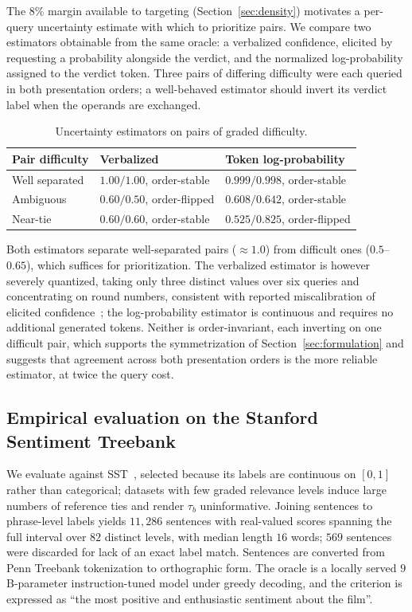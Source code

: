 \documentclass[11pt,a4paper]{article}
\begin{document}
The $8\%$ margin available to targeting (Section~\ref{sec:density}) motivates a
per-query uncertainty estimate with which to prioritize pairs. We compare two
estimators obtainable from the same oracle: a verbalized confidence, elicited by
requesting a probability alongside the verdict, and the normalized
log-probability assigned to the verdict token. Three pairs of differing
difficulty were each queried in both presentation orders; a well-behaved
estimator should invert its verdict label when the operands are exchanged.

\begin{table}[h]
\centering
\begin{tabular}{lll}
\toprule
Pair difficulty & Verbalized & Token log-probability \\
\midrule
Well separated & $1.00 / 1.00$, order-stable  & $0.999 / 0.998$, order-stable \\
Ambiguous      & $0.60 / 0.50$, order-flipped & $0.608 / 0.642$, order-stable \\
Near-tie       & $0.60 / 0.60$, order-stable  & $0.525 / 0.825$, order-flipped \\
\bottomrule
\end{tabular}
\caption{Uncertainty estimators on pairs of graded difficulty.}
\label{tab:conf}
\end{table}

Both estimators separate well-separated pairs (${\approx}1.0$) from difficult
ones ($0.5$--$0.65$), which suffices for prioritization. The verbalized estimator
is however severely quantized, taking only three distinct values over six
queries and concentrating on round numbers, consistent with reported
miscalibration of elicited confidence~\cite{tian2023}; the log-probability
estimator is continuous and requires no additional generated tokens. Neither is
order-invariant, each inverting on one difficult pair, which supports the
symmetrization of Section~\ref{sec:formulation} and suggests that agreement
across both presentation orders is the more reliable estimator, at twice the
query cost.

\subsection{Empirical evaluation on the Stanford Sentiment Treebank}
\label{sec:sst}

We evaluate against SST~\cite{socher2013}, selected because its labels are
continuous on $[0,1]$ rather than categorical; datasets with few graded
relevance levels induce large numbers of reference ties and render $\tau_b$
uninformative. Joining sentences to phrase-level labels yields $11{,}286$
sentences with real-valued scores spanning the full interval over $82$ distinct
levels, with median length $16$ words; $569$ sentences were discarded for lack of
an exact label match. Sentences are converted from Penn Treebank tokenization to
orthographic form. The oracle is a locally served $9$B-parameter instruction-tuned
model under greedy decoding, and the criterion is expressed as ``the most
positive and enthusiastic sentiment about the film''.
\end{document}
